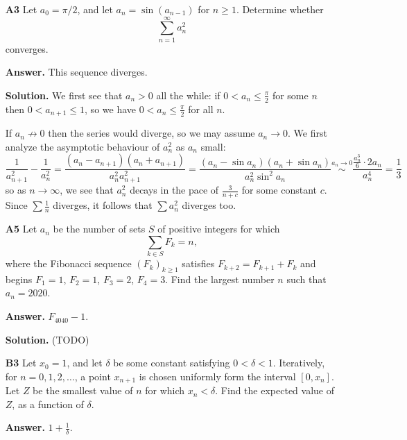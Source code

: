 \documentclass[11pt,a4paper]{article}
\newcommand{\<}{\langle}
\renewcommand{\>}{\rangle}
\begin{document}
\begin{enumerate}
    \item [\textbf{A3}] 
    Let $a_0=\pi /2$, and let $a_n=\sin (a_{n-1})$ for $n\ge 1$. Determine whether
    \[ \sum_{n=1}^{\infty}a_n^2 \]converges.
    
    \textbf{Answer.} This sequence diverges. 
    
    \textbf{Solution.} We first see that $a_n>0$ all the while: if $0<a_n\le \frac{\pi}{2}$ for some $n$ then $0 < a_{n+1}\le 1$, 
    so we have $0<a_n\le \frac{\pi}{2}$ for all $n$. 
    
    If $a_n\not\to 0$ then the series would diverge, so we may assume $a_n\to 0$. 
    We first analyze the asymptotic behaviour of $a_n^2$ as $a_n$ small: 
    \[
    \frac{1}{a_{n+1}^2}-\frac{1}{a_n^2}
    =\frac{(a_n-a_{n+1})(a_n+a_{n+1})}{a_n^2a_{n+1}^2}
    =\frac{(a_n-\sin a_n)(a_n+\sin a_n)}{a_n^2\sin^2 a_n}
    \stackrel{a_n\to 0}{\sim} \frac{\frac{a_n^3}{6}\cdot 2a_n}{a_n^4}
    =\frac 13
    \]
    so as $n\to\infty$, we see that $a_n^2$ decays in the pace of $\frac{3}{n+c}$ for some constant $c$. 
    Since $\sum \frac{1}{n}$ diverges, it follows that $\sum a_n^2$ diverges too. 
	
	\item [\textbf{A5}] 
	Let $a_n$ be the number of sets $S$ of positive integers for which
	\[ \sum_{k\in S}F_k=n,\]where the Fibonacci sequence $(F_k)_{k\ge 1}$ satisfies $F_{k+2}=F_{k+1}+F_k$ and begins $F_1=1$, $F_2=1$, $F_3=2$, $F_4=3$. Find the largest number $n$ such that $a_n=2020$.
	
	\textbf{Answer.} $F_{4040}-1$. 
	
	\textbf{Solution.} (TODO)
	
	\item [\textbf{B3}] Let $x_0=1$, and let $\delta$ be some constant satisfying $0<\delta<1$. Iteratively, for $n=0,1,2,\dots$, a point $x_{n+1}$ is chosen uniformly form the interval $[0,x_n]$. Let $Z$ be the smallest value of $n$ for which $x_n<\delta$. Find the expected value of $Z$, as a function of $\delta$.
	
	\textbf{Answer.} $1+\frac{1}{\delta}$. 
	

\end{enumerate}
\end{document}

